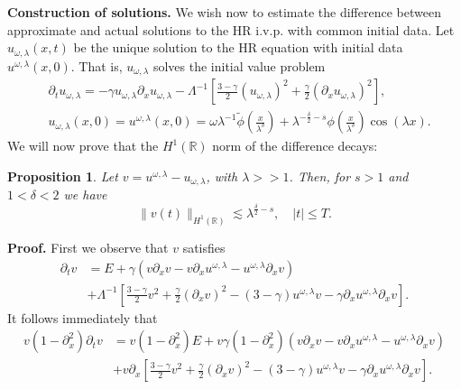 \documentclass[12pt,reqno]{amsart}
\newcommand{\rr}{\mathbb{R}}
\newcommand{\p}{\partial}
\theoremstyle{plain}  %
\newtheorem{proposition}{Proposition}
\theoremstyle{definition}
\begin{document}
{\bf Construction of  solutions.}
We wish now to estimate the difference between approximate and actual 
solutions to
the HR i.v.p. with common initial data. Let
$u_{\omega,\lambda}(x,t)$ be the unique solution to the HR equation
with initial data $u^{\omega,\lambda}(x,0)$. That is,
$u_{\omega,\lambda}$ solves the initial value problem
\begin{align}
& \p_t u_{\omega,\lambda} = - \gamma u_{\omega,\lambda} \p_x 
u_{\omega,\lambda} - \Lambda^{-1} \left[
\frac{3- \gamma}{2}\left( u_{\omega,\lambda} \right)^2 + 
\frac{\gamma}{2}\left(
\p_x u_{\omega,\lambda} \right)^2
\right], \label{apple50}
\\
& u_{\omega,\lambda}(x, 0) = u^{\omega,\lambda}(x,0) = \omega \lambda^{-1}
\tilde{\phi} \left( \frac{x}{\lambda^\delta} \right)
+ \lambda^{-\frac{\delta}{2} -s}
\phi\left( \frac{x}{\lambda^\delta} \right) \cos(\lambda x).
\label{apple41}
\end{align}
%
%
%
We will now prove that the $H^1(\rr)$ norm of the difference decays: 
%
%
%
%
%
%
%
%
%
%
%
%
%
%
%
\begin{proposition}
\label{applelem:bound_for_difference-of-approx-and-actual-soln}
%
Let $v = u^{\omega,\lambda} - u_{\omega,\lambda}$, with $\lambda >>1$.
Then, for $s > 1$ and $1<\delta<2$ we have
%
%
\begin{equation} \|
v(t)
\|_{H^1(\rr)}
\lesssim \lambda^{\frac{\delta}{2} -s}, \quad
|t| \le T.
\end{equation}
%
%
\end{proposition}
%
%
{\bf   Proof.}  First we observe that $v$ satisfies 
%
%
\begin{equation*}
\begin{split}
\p_t v & = E + \gamma(v \p_x v - v \p_x u^{\omega,\lambda} - 
u^{\omega,\lambda} \p_x v) \\
& + \Lambda^{-1}  \left[ \frac{3-
\gamma}{2}v^2 + \frac{\gamma}{2}\left( \p_x v \right)^2 - \left(
3 - \gamma \right)u^{\omega,\lambda} v -
\gamma \p_x u^{\omega,\lambda} \p_x v \right].
\end{split}
\end{equation*}
It follows immediately that
		\begin{equation}
			\label{applev-dtv-pseudo-functional-equality*}
			\begin{split}
			v(1-\p_x^2)\p_t v &= v(1- \p_x^2)E + v\gamma(1- \p_x^2)(v\p_x v 
			- v\p_x u^{\omega,\lambda} -
			u^{\omega,\lambda} \p_x v)
			\\
			&+ v\p_x \left[ \frac{3-\gamma}{2}v^2 + \frac{\gamma}{2}(\p_x v)^2 -
			(3-\gamma)u^{\omega,\lambda} v - \gamma \p_x u^{\omega,\lambda} \p_x v \right].
		\end{split}
	\end{equation}
\end{document}
